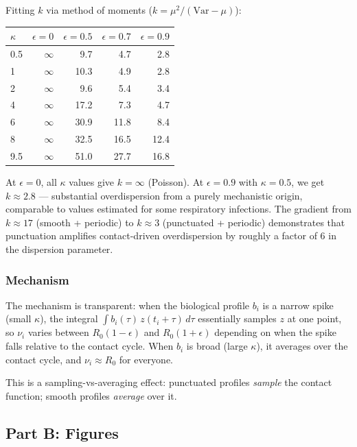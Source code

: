 \documentclass[11pt]{article}
\begin{document}
Fitting $k$ via method of moments ($k = \mu^2 / (\text{Var} - \mu)$):

\medskip
{\small
\begin{tabular}{lrrrr}
\toprule
$\kappa$ & $\epsilon = 0$ & $\epsilon = 0.5$ & $\epsilon = 0.7$ & $\epsilon = 0.9$ \\
\midrule
0.5  & $\infty$ & 9.7  & 4.7  & 2.8  \\
1    & $\infty$ & 10.3 & 4.9  & 2.8  \\
2    & $\infty$ & 9.6  & 5.4  & 3.4  \\
4    & $\infty$ & 17.2 & 7.3  & 4.7  \\
6    & $\infty$ & 30.9 & 11.8 & 8.4  \\
8    & $\infty$ & 32.5 & 16.5 & 12.4 \\
9.5  & $\infty$ & 51.0 & 27.7 & 16.8 \\
\bottomrule
\end{tabular}
}
\medskip

At $\epsilon = 0$, all $\kappa$ values give $k = \infty$ (Poisson). At $\epsilon = 0.9$ with $\kappa = 0.5$, we get $k \approx 2.8$ --- substantial overdispersion from a purely mechanistic origin, comparable to values estimated for some respiratory infections. The gradient from $k \approx 17$ (smooth + periodic) to $k \approx 3$ (punctuated + periodic) demonstrates that punctuation amplifies contact-driven overdispersion by roughly a factor of 6 in the dispersion parameter.

\subsubsection{Mechanism}

The mechanism is transparent: when the biological profile $b_i$ is a narrow spike (small $\kappa$), the integral $\int b_i(\tau) \, z(t_i + \tau) \, d\tau$ essentially samples $z$ at one point, so $\nu_i$ varies between $R_0(1 - \epsilon)$ and $R_0(1 + \epsilon)$ depending on when the spike falls relative to the contact cycle. When $b_i$ is broad (large $\kappa$), it averages over the contact cycle, and $\nu_i \approx R_0$ for everyone.

This is a sampling-vs-averaging effect: punctuated profiles \textit{sample} the contact function; smooth profiles \textit{average} over it.

\subsection{Part B: Figures}
\end{document}
